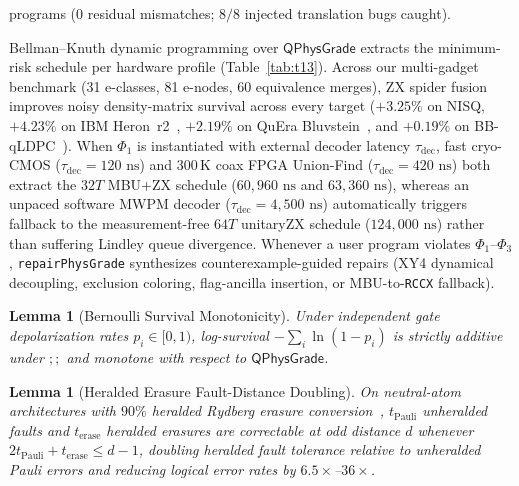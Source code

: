 \documentclass[acmsmall,screen,anonymous]{acmart}
\DeclareRobustCommand{\_}{\ifmmode\text{\char95}\else\char95\penalty0\relax\fi}
\theoremstyle{plain}
\newtheorem{lemma}[theorem]{Lemma}
\newcommand{\QPhysGrade}{\ensuremath{\mathsf{QPhysGrade}}}
\begin{document}
programs ($0$ residual mismatches; $8/8$ injected translation bugs caught).

Bellman--Knuth dynamic programming over $\QPhysGrade$ extracts the minimum-risk schedule per hardware profile (Table~\ref{tab:t13}). Across our multi-gadget benchmark (31 e-classes, 81 e-nodes, 60 equivalence merges), ZX spider fusion improves noisy density-matrix survival across every target ($+3.25\%$ on NISQ, $+4.23\%$ on IBM Heron~r2~\cite{ibmheron2026}, $+2.19\%$ on QuEra Bluvstein~\cite{bluvstein2024,bluvstein2026}, and $+0.19\%$ on BB-qLDPC~\cite{bravyi2024}). When $\Phi_1$ is instantiated with external decoder latency $\tau_{\mathrm{dec}}$, fast cryo-CMOS ($\tau_{\mathrm{dec}} = 120\text{ ns}$) and 300\,K coax FPGA Union-Find ($\tau_{\mathrm{dec}} = 420\text{ ns}$) both extract the $32T$ MBU+ZX schedule ($60{,}960\text{ ns}$ and $63{,}360\text{ ns}$), whereas an unpaced software MWPM decoder ($\tau_{\mathrm{dec}} = 4{,}500\text{ ns}$) automatically triggers fallback to the measurement-free $64T$ unitaryZX schedule ($124{,}000\text{ ns}$) rather than suffering Lindley queue divergence. Whenever a user program violates $\Phi_1$--$\Phi_3$, \texttt{repairPhysGrade} synthesizes counterexample-guided repairs (XY4 dynamical decoupling, exclusion coloring, flag-ancilla insertion, or MBU-to-\texttt{RCCX} fallback).

\begin{lemma}[Bernoulli Survival Monotonicity]
\label{lem:l1}
Under independent gate depolarization rates $p_i \in [0, 1)$, log-survival $-\sum_i \ln(1 - p_i)$ is strictly additive under $\mathbin{;;}$ and monotone with respect to $\QPhysGrade$.
\end{lemma}

\begin{lemma}[Heralded Erasure Fault-Distance Doubling]
\label{lem:l2}
On neutral-atom architectures with $90\%$ heralded Rydberg erasure conversion~\cite{bluvstein2024,googlewillow2025}, $t_{\mathrm{Pauli}}$ unheralded faults and $t_{\mathrm{erase}}$ heralded erasures are correctable at odd distance $d$ whenever $2 t_{\mathrm{Pauli}} + t_{\mathrm{erase}} \le d - 1$, doubling heralded fault tolerance relative to unheralded Pauli errors and reducing logical error rates by $6.5\times$--$36\times$.
\end{lemma}
\end{document}
